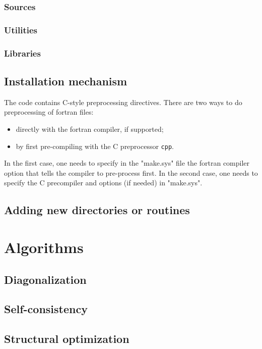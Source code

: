 \documentclass[12pt,a4paper]{article}
\begin{document}
\subsubsection{Sources}

\subsubsection{Utilities}

\subsubsection{Libraries}

\subsection{Installation mechanism}

The code contains C-style preprocessing directives. 
There are two ways to do preprocessing of fortran files:
\begin{itemize}
  \item directly with the fortran compiler, if supported;
  \item by first pre-compiling with the C preprocessor {\tt cpp}.
\end{itemize}
In the first case, one needs to specify in the "make.sys" file the
fortran compiler option that tells the compiler 
to pre-process first. In the second case, one needs to 
specify the C precompiler and options (if needed) in "make.sys".

\subsection{Adding new directories or routines}

\section{Algorithms}

\subsection{Diagonalization}

\subsection{Self-consistency}

\subsection{Structural optimization}
\end{document}
